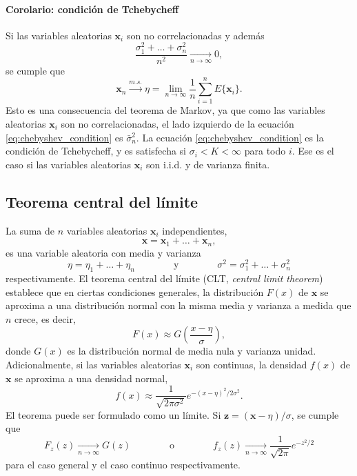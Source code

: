 \documentclass[a4paper]{report}
\newcommand{\x}{\mathbf{x}}
\newcommand{\z}{\mathbf{z}}
\begin{document}
\paragraph{Corolario: condición de Tchebycheff} Si las variables aleatorias \(\x_i\) son no correlacionadas y además
\begin{equation}\label{eq:chebyshev_condition}
 \frac{\sigma^2_1+\dots+\sigma^2_n}{n^2}\xrightarrow[n\to\infty]{}0,
\end{equation}
se cumple que 
\[
 \x_n\xrightarrow[]{m.s.}\eta=\lim_{n\to\infty}\frac{1}{n}\sum_{i=1}^nE\{\x_i\}.
\]
Esto es una consecuencia del teorema de Markov, ya que como las variables aleatorias \(\x_i\) son no correlacionadas, el lado izquierdo de la ecuación \ref{eq:chebyshev_condition} es \(\bar{\sigma}^2_n\). La ecuación \ref{eq:chebyshev_condition} es la condición de Tchebycheff, y es satisfecha si \(\sigma_i<K<\infty\) para todo \(i\). Ese es el caso si las variables aleatorias \(\x_i\) son i.i.d. y de varianza finita.

\subsection{Teorema central del límite}\label{sec:clt}

La suma de \(n\) variables aleatorias \(\x_i\) independientes,
\[
 \x=\x_1+\dots+\x_n,
\]
es una variable aleatoria con media y varianza
\begin{equation}\label{eq:clt_mean_and_variance}
 \eta=\eta_1+\dots+\eta_n\qquad\qquad\textrm{y}\qquad\qquad\sigma^2=\sigma^2_1+\dots+\sigma^2_n
\end{equation}
respectivamente. El teorema central del límite (CLT, \emph{central limit theorem}) establece que en ciertas condiciones generales, la distribución \(F(x)\) de \(\x\) se aproxima a una distribución normal con la misma media y varianza a medida que \(n\) crece, es decir,
\[
 F(x)\approx G\left(\frac{x-\eta}{\sigma}\right),
\]
donde \(G(x)\) es la distribución normal de media nula y varianza unidad.
Adicionalmente, si las variables aleatorias \(\x_i\) son continuas, la densidad \(f(x)\) de \(\x\) se aproxima a una densidad normal,
\begin{equation}\label{eq:central_limit_theorem_density}
 f(x)\approx\frac{1}{\sqrt{2\pi\sigma^2}}e^{-(x-\eta)^2/2\sigma^2}.
\end{equation}
El teorema puede ser formulado como un límite. Si \(\z=(\x-\eta)/\sigma\), se cumple que 
\[
 F_z(z)\xrightarrow[n\to\infty]{}G(z)
 \qquad\qquad\textrm{o}\qquad\qquad
 f_z(z)\xrightarrow[n\to\infty]{}\frac{1}{\sqrt{2\pi}}e^{-z^2/2}
\]
para el caso general y el caso continuo respectivamente.
\end{document}
